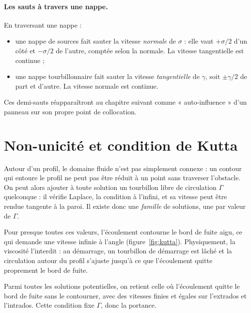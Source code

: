 \paragraph{Les sauts à travers une nappe.} En traversant une nappe :
\begin{itemize}
\item une nappe de sources fait sauter la vitesse \emph{normale} de $\sigma$ : elle vaut $+\sigma/2$ d'un côté et $-\sigma/2$ de l'autre, comptée selon la normale. La vitesse tangentielle est continue ;
\item une nappe tourbillonnaire fait sauter la vitesse \emph{tangentielle} de $\gamma$, soit $\pm\gamma/2$ de part et d'autre. La vitesse normale est continue.
\end{itemize}
Ces demi-sauts réapparaîtront au chapitre suivant comme « auto-influence » d'un panneau sur son propre point de collocation.

\section{Non-unicité et condition de Kutta}
Autour d'un profil, le domaine fluide n'est pas simplement connexe : un contour qui entoure le profil ne peut pas être réduit à un point sans traverser l'obstacle. On peut alors ajouter à toute solution un tourbillon libre de circulation $\Gamma$ quelconque : il vérifie Laplace, la condition à l'infini, et sa vitesse peut être rendue tangente à la paroi. Il existe donc une \emph{famille} de solutions, une par valeur de $\Gamma$.

Pour presque toutes ces valeurs, l'écoulement contourne le bord de fuite aigu, ce qui demande une vitesse infinie à l'angle (figure~\ref{fig:kutta}). Physiquement, la viscosité l'interdit : au démarrage, un tourbillon de démarrage est lâché et la circulation autour du profil s'ajuste jusqu'à ce que l'écoulement quitte proprement le bord de fuite.

\begin{definition}
Parmi toutes les solutions potentielles, on retient celle où l'écoulement quitte le bord de fuite sans le contourner, avec des vitesses finies et égales sur l'extrados et l'intrados. Cette condition fixe $\Gamma$, donc la portance.
\end{definition}


